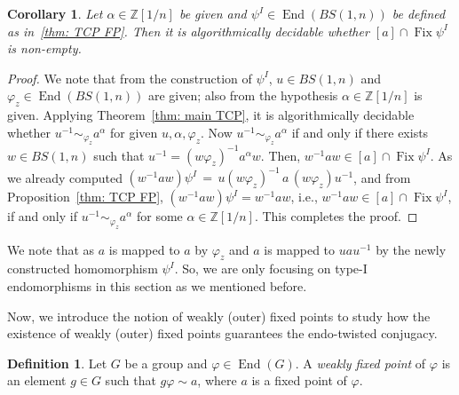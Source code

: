 \documentclass[a4paper]{amsart}
\newtheorem{cor}[thm]{Corollary}
\theoremstyle{definition}
\newtheorem{dfn}[thm]{Definition}
\newcommand\ZZ{\mathbb{Z}}
\newcommand{\End}{\operatorname{End}}
\newcommand{\Fix}{\operatorname{Fix}}
\begin{document}
\begin{cor}
    Let $\alpha \in \ZZ[1/n]$ be given and $\psi^{I} \in \End(BS(1, n))$ be defined as in~\ref {thm: TCP FP}. Then it is algorithmically decidable whether $[a] \cap \Fix\psi^I$ is non-empty.
\end{cor}

\begin{proof}
    We note that from the construction of $\psi^I$, $u \in BS(1,n)$ and $\varphi_z \in \End(BS(1,n))$ are given; also from the hypothesis $\alpha \in \ZZ[1/n]$ is given. Applying Theorem~\ref{thm: main TCP}, it is algorithmically decidable whether $u^{-1} \sim_{\varphi_z} a^{\alpha}$ for given $u, \alpha, \varphi_z$. Now $u^{-1} \sim_{\varphi_z} a^{\alpha}$ if and only if there exists $w \in BS(1, n)$ such that $u^{-1} = (w\varphi_z)^{-1} a^{\alpha} w$. Then, $w^{-1} a w \in [a] \cap \Fix \psi^{I}$. As we already computed $(w^{-1} a w) \psi^{I} \, = \, u(w\varphi_z)^{-1} \, a \, (w\varphi_z)u^{-1}$, and from Proposition~\ref {thm: TCP FP}, $(w^{-1} a w) \psi^{I} = w^{-1} a w$, i.e., $w^{-1} a w \in [a] \cap \Fix \psi^{I}$, if and only if $u^{-1} \sim_{\varphi_z} a^{\alpha}$ for some $\alpha \in \ZZ[1/n]$. This completes the proof. 
\end{proof}


We note that as $a$ is mapped to $a$ by $\varphi_z$ and $a$ is mapped to $uau^{-1}$ by the newly constructed homomorphism $\psi^{I}$. So, we are only focusing on type-I endomorphisms in this section as we mentioned before.

Now, we introduce the notion of weakly (outer) fixed points to study how the existence of weakly (outer) fixed points guarantees the endo-twisted conjugacy.

\begin{dfn}
   Let $G$ be a group and $\varphi \in \End(G)$. A \emph{weakly fixed point} of $\varphi$ is an element $g \in G$ such that $g \varphi \sim a$, where $a$ is a fixed point of $\varphi$. 
\end{dfn}

\end{document}
